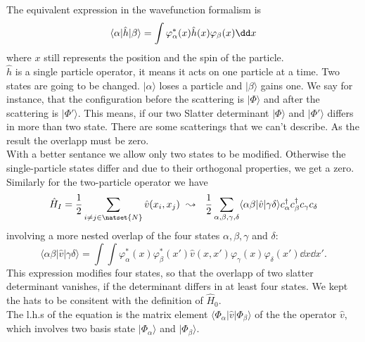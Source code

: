 \documentclass[../main.tex]{subfile}
\begin{document}
The equivalent expression in the wavefunction formalism is
\begin{equation}\label{eq:Translation_TwoStateOverlap}  
    \langle \alpha|\hat{h}|\beta\rangle = \int  \varphi_{\alpha}^{\ast}(x) \hat{h}(x) \varphi_{\beta}(x) \dd x\\
\end{equation}
where $x$ still represents the position and the spin of the particle.\\
$\hat{h}$ is a single particle operator, it means it acts on one particle at a time.
Two states are going to be changed. $|\alpha\rangle$ loses a particle and $|\beta\rangle$ gains one. We say for instance, that the 
configuration before the scattering is $|\Phi\rangle$ and after the scattering is $|\Phi'\rangle$. 
This means, if our two Slatter determinant $|\Phi\rangle$ and $|\Phi'\rangle$ differs in more than two state. There are
some scatterings that we can't describe. As the result the overlapp must be zero.\\

With a better sentance we allow only two states to be modified. Otherwise the single-particle
states differ and due to their orthogonal properties, we get a zero.\\

Similarly for the two-particle operator we have
\begin{equation}\label{eq:SecondQuantisationDoubleParticle}
    \hat{H}_I = \frac{1}{2}\sum_{i\neq j \in \natset{N}} \hat{v}(x_i, x_j) ~ \leadsto ~~ \frac{1}{2}\sum_{\alpha,\beta,\gamma,\delta} \langle \alpha\beta|\hat{v}|\gamma\delta\rangle c_{\alpha}^{\dagger}c_{\beta}^{\dagger}c_{\gamma}c_{\delta}
\end{equation}
involving a more nested overlap of the four states $\alpha,\beta,\gamma$ and $\delta$:
\begin{equation}\label{eq:Translation_FourStateOverlap}
    \langle\alpha\beta|\hat{v}|\gamma\delta\rangle = \int \int \varphi_{\alpha}^{\ast}(x) \varphi_{\beta}^{\ast}(x') \hat{v}(x,x') \varphi_{\gamma}(x) \varphi_{\delta}(x') \dd x \dd x'.
\end{equation}
This expression modifies four states, so that the overlapp of two slatter determinant vanishes, if the determinant differs in at least four states. We kept the hats
to be consitent with the definition of $\hat{H}_0$.\\ 

The l.h.s of the equation is the matrix element $\langle\Phi_{\alpha}|\hat{v}|\Phi_{\beta}\rangle$ of the the operator
 $\hat{v}$, which involves two basis state $|\Phi_{\alpha}\rangle$ and $|\Phi_{\beta}\rangle$.\\
 
\end{document}

